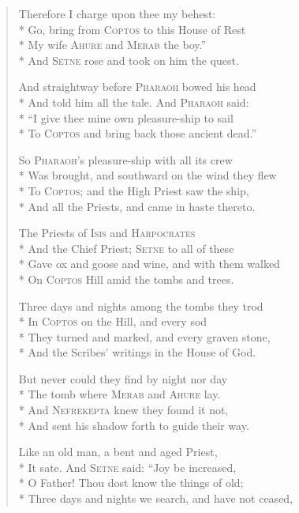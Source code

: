 \documentclass[12pt]{article}
\newcommand{\vin}{\hspace{1em}}
\begin{document}
\begin{verse}
Therefore I charge upon thee my behest:\\*
Go, bring from \textsc{Coptos} to this House of Rest\\*
\vin My wife \textsc{Ahure} and \textsc{Merab} the boy.''\\*
And \textsc{Setne} rose and took on him the quest.

And straightway before \textsc{Pharaoh} bowed his head\\*
And told him all the tale. And \textsc{Pharaoh} said:\\*
\vin ``I give thee mine own pleasure-ship to sail\\*
To \textsc{Coptos} and bring back those ancient dead.''

So \textsc{Pharaoh}'s pleasure-ship with all its crew\\*
Was brought, and southward on the wind they flew\\*
\vin To \textsc{Coptos}; and the High Priest saw the ship,\\*
And all the Priests, and came in haste thereto.

The Priests of \textsc{Isis} and \textsc{Harpocrates}\\*
And the Chief Priest; \textsc{Setne} to all of these\\*
\vin Gave ox and goose and wine, and with them walked\\*
On \textsc{Coptos} Hill amid the tombs and trees.

Three days and nights among the tombs they trod\\*
In \textsc{Coptos} on the Hill, and every sod\\*
\vin They turned and marked, and every graven stone,\\*
And the Scribes' writings in the House of God.

But never could they find by night nor day\\*
The tomb where \textsc{Merab} and \textsc{Ahure} lay.\\*
\vin And \textsc{Nefrekepta} knew they found it not,\\*
And sent his shadow forth to guide their way.

Like an old man, a bent and aged Priest,\\*
It sate. And \textsc{Setne} said: ``Joy be increased,\\*
\vin O Father! Thou dost know the things of old;\\*
Three days and nights we search, and have not ceased,


\end{verse}
\end{document}
